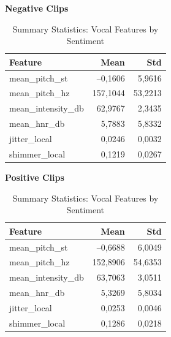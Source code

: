   \begin{table}[H]
    \centering
    \begin{subtable}{0.45\textwidth}
      \centering
      \caption*{\textbf{Negative Clips}}
      \begin{tabular}{lrr}
        \toprule
        \textbf{Feature}         & \textbf{Mean}    & \textbf{Std}    \\
        \midrule
        mean\_pitch\_st          & –0,1606          & 5,9616          \\
        mean\_pitch\_hz          & 157,1044         & 53,2213         \\
        mean\_intensity\_db      & 62,9767          & 2,3435          \\
        mean\_hnr\_db            & 5,7883           & 5,8332          \\
        jitter\_local            & 0,0246           & 0,0032          \\
        shimmer\_local           & 0,1219           & 0,0267          \\
        \bottomrule
      \end{tabular}
    \end{subtable}\hfill
    \begin{subtable}{0.45\textwidth}
      \centering
      \caption*{\textbf{Positive Clips}}
      \begin{tabular}{lrr}
        \toprule
        \textbf{Feature}         & \textbf{Mean}    & \textbf{Std}    \\
        \midrule
        mean\_pitch\_st          & –0,6688          & 6,0049          \\
        mean\_pitch\_hz          & 152,8906         & 54,6353         \\
        mean\_intensity\_db      & 63,7063          & 3,0511          \\
        mean\_hnr\_db            & 5,3269           & 5,8034          \\
        jitter\_local            & 0,0253           & 0,0046          \\
        shimmer\_local           & 0,1286           & 0,0218          \\
        \bottomrule
      \end{tabular}
    \end{subtable}
    \caption{Summary Statistics: Vocal Features by Sentiment}
    \label{tab:summary_vocal_features_by_sentiment}
  \end{table}
  
